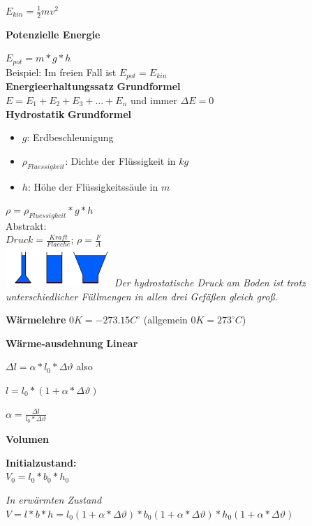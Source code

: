 \documentclass[a4paper,9pt]{article}
\begin{document}
\begin{multicols}{4}
	\(E_{kin} = \frac{1}{2} mv^2\)
	
	\textbf{Potenzielle Energie}
	
	\(E_{pot} = m * g * h\)\\
	Beispiel: Im freien Fall ist \(E_{pot} = E_{kin}\)\\
	
	
	\textbf{Energieerhaltungssatz}
	\textbf{Grundformel}\\
	\(E = E_1 + E_2 + E_3 + \dots + E_n\) und immer \(\Delta E = 0\)\\
	
	\textbf{Hydrostatik}
	\textbf{Grundformel}\\
	\begin{itemize}
		\item \(g\): Erdbeschleunigung
		\item \(\rho_{Fluessigkeit}\): Dichte der Flüssigkeit in \(kg\)
		\item \(h\): Höhe der Flüssigkeitssäule in \(m\)
	\end{itemize}
	\(\rho = \rho_{Fluessigkeit} * g * h\)\\
	Abstrakt:\\
	\(Druck = \frac{Kraft}{Flaeche}\); \(\rho = \frac{F}{A}\) \\
	\includegraphics[width=4cm]{hydrostatik}
	\textit{Der hydrostatische Druck am Boden ist trotz unterschiedlicher Füllmengen in allen drei Gefäßen gleich groß.}
	
	  \textbf{Wärmelehre}
	  $ 0 K = - 273.15 C^\circ $ (allgemein $ 0 K = 273^\circ C $)
	  
	  \textbf{Wärme-ausdehnung}
	  \textbf{Linear}
	  
	  $ \Delta l = \alpha * l_0 * \Delta \vartheta $ also
	  
	  $ l = l_0 * (1 + \alpha * \Delta \vartheta) $
	  
	  $ \alpha = \frac{\Delta l}{l_0 * \Delta \vartheta} $
	  
	  \textbf{Volumen}
	  
	  \textbf{Initialzustand:}\\
	  
	  $ V_0 = l_0 * b_0 * h_0 $
	  
	  \textit{In erwärmten Zustand}\\
	  
	  $ V = l * b * h = l_0 (1 + \alpha * \Delta \vartheta) * b_0 (1 + \alpha * \Delta \vartheta) * h_0 (1 + \alpha * \Delta \vartheta) $\\
	  

\end{multicols}
\end{document}
